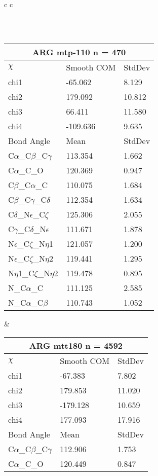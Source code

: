 \begin{longtable}{ c c }
\begin{tabular}{ l l l }
  \bottomrule
  \end{tabular}
  \\
  \begin{tabular}{ l l l }
  \toprule
  \multicolumn{3}{c}{ARG \textbf{mtp-110} n = 470} \\ \toprule
  $\chi$       & Smooth COM & StdDev \\ \midrule
  chi1 & -65.062 & 8.129 \\ 
  chi2 & 179.092 & 10.812 \\ 
  chi3 & 66.411 & 11.580 \\ 
  chi4 & -109.636 & 9.635 \\ \midrule
  Bond Angle   & Mean     & StdDev \\ \midrule
  C$\alpha$\_C$\beta$\_C$\gamma$ & 113.354 & 1.662\\
  C$\alpha$\_C\_O & 120.369 & 0.947\\
  C$\beta$\_C$\alpha$\_C & 110.075 & 1.684\\
  C$\beta$\_C$\gamma$\_C$\delta$ & 112.354 & 1.634\\
  C$\delta$\_N$\epsilon$\_C$\zeta$ & 125.306 & 2.055\\
  C$\gamma$\_C$\delta$\_N$\epsilon$ & 111.671 & 1.878\\
  N$\epsilon$\_C$\zeta$\_N$\eta$1 & 121.057 & 1.200\\
  N$\epsilon$\_C$\zeta$\_N$\eta$2 & 119.441 & 1.295\\
  N$\eta$1\_C$\zeta$\_N$\eta$2 & 119.478 & 0.895\\
  N\_C$\alpha$\_C & 111.125 & 2.585\\
  N\_C$\alpha$\_C$\beta$ & 110.743 & 1.052\\
  \bottomrule
  \end{tabular}
  &
  \begin{tabular}{ l l l }
  \toprule
  \multicolumn{3}{c}{ARG \textbf{mtt180} n = 4592} \\ \toprule
  $\chi$       & Smooth COM & StdDev \\ \midrule
  chi1 & -67.383 & 7.802 \\ 
  chi2 & 179.853 & 11.020 \\ 
  chi3 & -179.128 & 10.659 \\ 
  chi4 & 177.093 & 17.916 \\ \midrule
  Bond Angle   & Mean     & StdDev \\ \midrule
  C$\alpha$\_C$\beta$\_C$\gamma$ & 112.906 & 1.753\\
  C$\alpha$\_C\_O & 120.449 & 0.847\\

\end{tabular}
\end{longtable}
